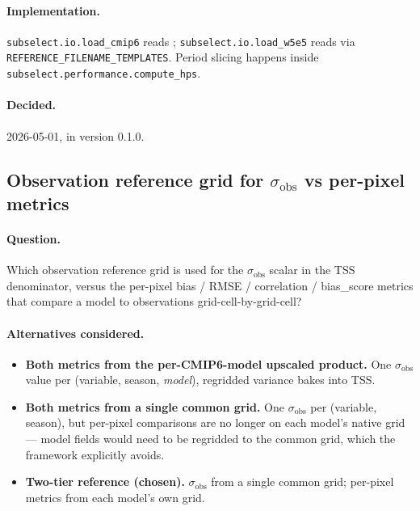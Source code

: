 \documentclass[11pt,a4paper]{article}
\begin{document}
\paragraph{Implementation.} \texttt{subselect.io.load\_cmip6} reads
;
\texttt{subselect.io.load\_w5e5} reads
via \texttt{REFERENCE\_FILENAME\_TEMPLATES}. Period slicing happens
inside \texttt{subselect.performance.compute\_hps}.

\paragraph{Decided.} 2026-05-01, in version 0.1.0.

\subsection{Observation reference grid for $\sigma_{\text{obs}}$ vs per-pixel metrics}\label{sec:performance-sigma-obs-grid}

\paragraph{Question.} Which observation reference grid is used for the
$\sigma_{\text{obs}}$ scalar in the TSS denominator, versus the per-pixel
bias / RMSE / correlation / bias\_score metrics that compare a model to
observations grid-cell-by-grid-cell?

\paragraph{Alternatives considered.}
\begin{itemize}
  \item \textbf{Both metrics from the per-CMIP6-model upscaled product.} One
        $\sigma_{\text{obs}}$ value per (variable, season, \emph{model}),
        regridded variance bakes into TSS.
  \item \textbf{Both metrics from a single common grid.} One
        $\sigma_{\text{obs}}$ per (variable, season), but per-pixel
        comparisons are no longer on each model's native grid --- model
        fields would need to be regridded to the common grid, which the
        framework explicitly avoids.
  \item \textbf{Two-tier reference (chosen).} $\sigma_{\text{obs}}$ from a
        single common grid; per-pixel metrics from each model's own grid.
\end{itemize}
\end{document}
